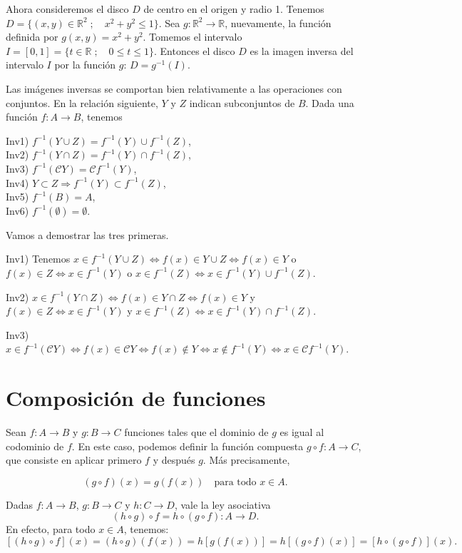 Ahora consideremos el disco \(D\) de centro en el origen y radio 1. Tenemos \(D = \{(x, y) \in \mathbb{R}^2 \; ; \quad x^2 + y^2 \leq 1\}\). Sea \(g: \mathbb{R}^2 \to \mathbb{R}\), nuevamente, la función definida por \(g(x, y) = x^2 + y^2\). Tomemos el intervalo \(I = [0, 1] = \{t \in \mathbb{R} \; ; \quad 0 \leq t \leq 1\}\). Entonces el disco \(D\) es la imagen inversa del intervalo \(I\) por la función \(g\): \(D = g^{-1}(I)\).

Las imágenes inversas se comportan bien relativamente a las operaciones con conjuntos. En la relación siguiente, \(Y\) y \(Z\) indican subconjuntos de \(B\). Dada una función \(f: A \to B\), tenemos

Inv1) \(f^{-1}(Y \cup Z) = f^{-1}(Y) \cup f^{-1}(Z)\),\\
Inv2) \(f^{-1}(Y \cap Z) = f^{-1}(Y) \cap f^{-1}(Z)\),\\
Inv3) \(f^{-1}(\mathcal{C}Y) = \mathcal{C} f^{-1}(Y)\),\\
Inv4) \(Y \subset Z \Rightarrow f^{-1}(Y) \subset f^{-1}(Z)\),\\
Inv5) \(f^{-1}(B) = A\),\\
Inv6) \(f^{-1}(\emptyset) = \emptyset\).

Vamos a demostrar las tres primeras.

Inv1) Tenemos \(x \in f^{-1}(Y \cup Z) \iff f(x) \in Y \cup Z \iff f(x) \in Y\) o \(f(x) \in Z \iff x \in f^{-1}(Y)\) o \(x \in f^{-1}(Z) \iff x \in f^{-1}(Y) \cup f^{-1}(Z)\).

Inv2) \(x \in f^{-1}(Y \cap Z) \iff f(x) \in Y \cap Z \iff f(x) \in Y\) y \(f(x) \in Z \iff x \in f^{-1}(Y)\) y \(x \in f^{-1}(Z) \iff x \in f^{-1}(Y) \cap f^{-1}(Z)\).

Inv3) \(x \in f^{-1}(\mathcal{C}Y) \iff f(x) \in \mathcal{C}Y \iff f(x) \notin Y \iff x \notin f^{-1}(Y) \iff x \in \mathcal{C} f^{-1}(Y)\).

\section{Composición de funciones}

Sean \(f: A \to B\) y \(g: B \to C\) funciones tales que el dominio de \(g\) es igual al codominio de \(f\). En este caso, podemos definir la función compuesta \(g \circ f: A \to C\), que consiste en aplicar primero \(f\) y después \(g\). Más precisamente,

\[
(g \circ f)(x) = g(f(x)) \quad \text{para todo } x \in A.
\]

Dadas \(f: A \to B\), \(g: B \to C\) y \(h: C \to D\), vale la ley asociativa
\[
(h \circ g) \circ f = h \circ (g \circ f): A \to D.
\]
En efecto, para todo \(x \in A\), tenemos:
\[
[(h \circ g) \circ f](x) = (h \circ g)(f(x)) = h[g(f(x))] = h[(g \circ f)(x)] = [h \circ (g \circ f)](x).
\]

